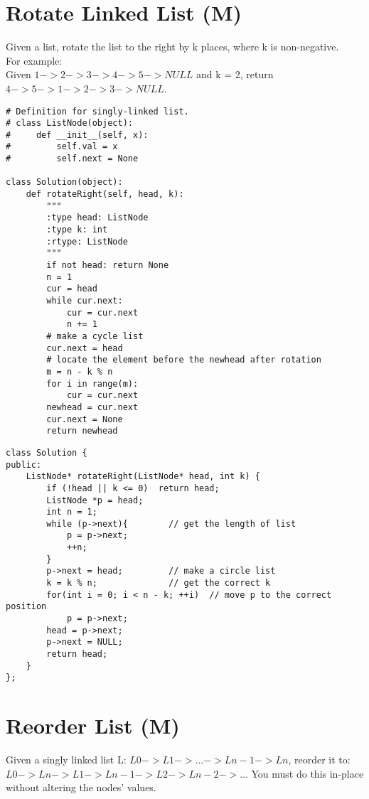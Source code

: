 \section{Rotate Linked List (M)}
Given a list, rotate the list to the right by k places, where k is non-negative.\\

For example:\\
Given $1->2->3->4->5->NULL$ and k = 2, return $4->5->1->2->3->NULL$.\\

\begin{lstlisting}
# Definition for singly-linked list.
# class ListNode(object):
#     def __init__(self, x):
#         self.val = x
#         self.next = None

class Solution(object):
    def rotateRight(self, head, k):
        """
        :type head: ListNode
        :type k: int
        :rtype: ListNode
        """
        if not head: return None
        n = 1
        cur = head
        while cur.next:
            cur = cur.next
            n += 1
        # make a cycle list
        cur.next = head
        # locate the element before the newhead after rotation
        m = n - k % n
        for i in range(m):
            cur = cur.next
        newhead = cur.next
        cur.next = None
        return newhead
\end{lstlisting}

\begin{lstlisting}
class Solution {
public:
    ListNode* rotateRight(ListNode* head, int k) {
        if (!head || k <= 0)  return head;
        ListNode *p = head;
        int n = 1;
        while (p->next){        // get the length of list
            p = p->next;
            ++n;
        }
        p->next = head;         // make a circle list
        k = k % n;              // get the correct k
        for(int i = 0; i < n - k; ++i)  // move p to the correct position
            p = p->next;
        head = p->next;
        p->next = NULL;
        return head;
    }
};
\end{lstlisting}


\section{Reorder List (M)}
Given a singly linked list L: $L0 -> L1 -> ... -> Ln-1 -> Ln$, reorder it to: $L0 -> Ln -> L1 -> Ln-1 -> L2 -> Ln-2 -> ...$ You must do this in-place without altering the nodes' values.\\

